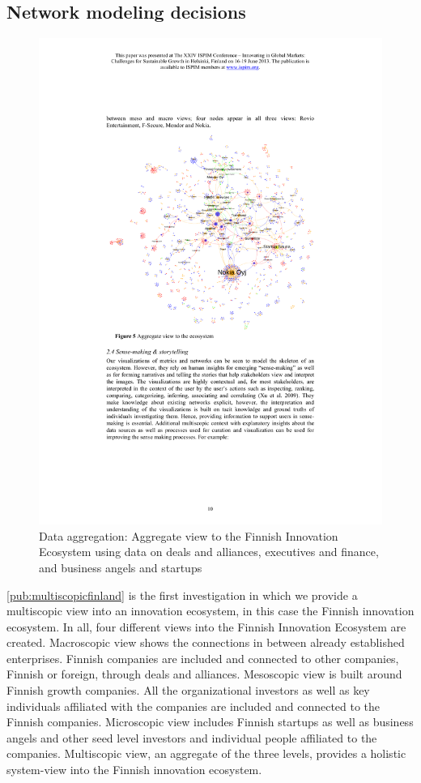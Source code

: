\subsection{Network modeling decisions}
\begin{figure}[htb]
\centering
\includegraphics[]{figure/Finland-Multiscopic.pdf}
\caption{Data aggregation: Aggregate view to the Finnish Innovation Ecosystem using data on deals and alliances, executives and finance, and business angels and startups  
\citep{Still2013NetworksFinland}}
\label{fig:finland-multiscopic}
\end{figure}

\ref{pub:multiscopicfinland} is the first investigation in which we provide a multiscopic view into an innovation ecosystem, in this case the Finnish innovation ecosystem. In all, four different views into the Finnish Innovation Ecosystem are created. Macroscopic view shows the connections in between already established enterprises. Finnish companies are included and connected to other companies, Finnish or foreign, through deals and alliances. Mesoscopic view is built around Finnish growth companies. All the organizational investors as well as key individuals affiliated with the companies are included and connected to the Finnish companies. Microscopic view includes Finnish startups as well as business angels and other seed level investors and individual people affiliated to the companies. Multiscopic view, an aggregate of the three levels, provides a holistic system-view into the Finnish innovation ecosystem. 

